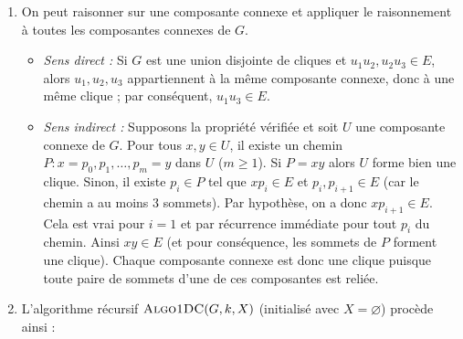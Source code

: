 \begin{td-sol}
    \begin{enumerate}[label=\alph*)]
        \item On peut raisonner sur une composante connexe et appliquer le raisonnement à toutes les composantes connexes de \(G\).
        \begin{itemize}
            \item \emph{Sens direct :} Si \(G\) est une union disjointe de cliques et \(u_1 u_2, u_2 u_3 \in E\), alors \(u_1, u_2, u_3\) appartiennent \`a la m\^eme composante connexe, donc \`a une m\^eme clique ; par cons\'equent, \(u_1 u_3 \in E\).
            \item \emph{Sens indirect :} Supposons la propri\'et\'e v\'erifi\'ee et soit \(U\) une composante connexe de \(G\). Pour tous \(x, y \in U\), il existe un chemin \(P \colon x = p_0, p_1, \ldots, p_m = y\) dans \(U\) (\(m \ge 1\)). Si \(P = xy\) alors \(U\) forme bien une clique. Sinon, il existe \(p_i \in P\) tel que \(xp_i \in E\) et \(p_i,p_{i+1}\in E\) (car le chemin a au moins 3 sommets). Par hypothèse, on a donc \(xp_{i+1} \in E\). Cela est vrai pour \(i=1\) et par récurrence immédiate pour tout \(p_i\) du chemin. Ainsi \(xy\in E\) (et pour conséquence, les sommets de \(P\) forment une clique).
            Chaque composante connexe est donc une clique puisque toute paire de sommets d'une de ces composantes est reliée.
        \end{itemize}

        \item L'algorithme r\'ecursif \(\textsc{Algo1DC}(G, k, X)\) (initialis\'e avec \(X = \varnothing\)) proc\`ede ainsi :



\end{enumerate}
\end{td-sol}
